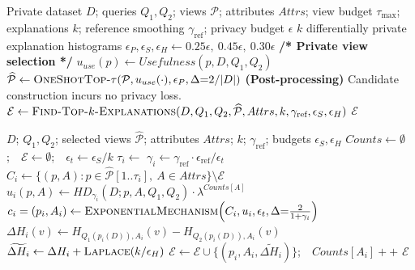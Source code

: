 \begin{algorithm}[t]
\caption{Private-Queries-Diff-Top-$k$-Explanation}
\label{alg:main}
\begin{algorithmic}[1]
\Require Private dataset $D$; queries $Q_1,Q_2$; views $\mathcal{P}$; attributes $Attrs$; view budget $\tau_{\max}$; explanations $k$; reference smoothing $\gamma_{\text{ref}}$; privacy budget $\epsilon$
\Ensure $k$ differentially private explanation histograms
\State $\epsilon_P,\epsilon_S,\epsilon_H \gets 0.25\epsilon,\ 0.45\epsilon,\ 0.30\epsilon$
\State \textbf{/* Private view selection */}
\State $u_{use}(p)\gets Usefulness(p,D,Q_1,Q_2)$
\State $\widehat{\mathcal{P}}\gets \textsc{OneShotTop-}\tau(\mathcal{P},u_{use}(\cdot),\epsilon_P,\Delta{=}2/|D|)$ 
\Statex \textbf{(Post-processing)} Candidate construction incurs no privacy loss.
\State $\mathcal{E}\gets \textsc{Find-Top-$k$-Explanations}(D,Q_1,Q_2,\widehat{\mathcal{P}},Attrs,k,\gamma_{\text{ref}},\epsilon_S,\epsilon_H)$
\State \Return $\mathcal{E}$
\end{algorithmic}
\end{algorithm}

\begin{algorithm}[t]
\caption{Find-Top-$k$-Explanations}
\label{alg:topk}
\begin{algorithmic}[1]
\Require $D$; $Q_1,Q_2$; selected views $\widehat{\mathcal{P}}$; attributes $Attrs$; $k$; $\gamma_{\text{ref}}$; budgets $\epsilon_S,\epsilon_H$
\State $Counts\gets\emptyset$;\ \ $\mathcal{E}\gets\emptyset$;\ \ $\epsilon_t \gets \epsilon_S/k$
  \State $\tau_i \gets$  
  \State $\gamma_i \gets \gamma_{\text{ref}}\cdot \epsilon_{\text{ref}}/\epsilon_t$ 
  \State $C_i \gets \{(p,A): p\in\widehat{\mathcal{P}}[1..\tau_i],\ A\in Attrs\}\setminus \mathcal{E}$
  \State $u_i(p,A)\gets HD_{\gamma_i}(D;p,A,Q_1,Q_2)\cdot \lambda^{Counts[A]}$
  \State $c_i=(p_i,A_i)\gets \textsc{ExponentialMechanism}\!\left(C_i,u_i,\epsilon_t,\Delta{=}\tfrac{2}{1+\gamma_i}\right)$
  \State $\Delta H_i(v)\gets H_{Q_1(p_i(D)),A_i}(v)-H_{Q_2(p_i(D)),A_i}(v)$
  \State $\widetilde{\Delta H_i}\gets \Delta H_i+\textsc{Laplace}(k/\epsilon_H)$
  \State $\mathcal{E}\gets\mathcal{E}\cup\{(p_i,A_i,\widetilde{\Delta H_i})\}$;\ \ $Counts[A_i]{+}{+}$
\EndFor
\State \Return $\mathcal{E}$
\end{algorithmic}
\end{algorithm}

